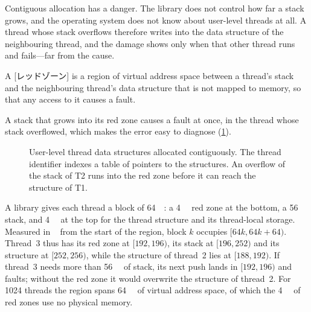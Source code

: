 \documentclass[../main.tex]{subfiles}
\begin{document}
Contiguous allocation has a danger.  The library does not control how far
a stack grows, and the operating system does not know about user-level
threads at all.  A thread whose stack overflows therefore writes into the
data structure of the neighbouring thread, and the damage shows only when
that other thread runs and fails---far from the cause.

\begin{definition}
  A [レッドゾーン] is a region of virtual address space
  between a thread's stack and the neighbouring thread's data structure
  that is not mapped to memory, so that any access to it causes a
  fault.
\end{definition}

A stack that grows into its red zone causes a fault at once, in the thread
whose stack overflowed, which makes the error easy to diagnose
(\cref{fig:l05-ult-layout}).

\begin{figure}[htbp]
  \centering
  
  \caption{User-level thread data structures allocated contiguously.  The
    thread identifier indexes a table of pointers to the structures.  An
    overflow of the stack of T2 runs into the red zone before it can reach
    the structure of T1.}
  \label{fig:l05-ult-layout}
\end{figure}

\begin{example}
  A library gives each thread a block of \SI{64}{\kibi\byte}: a
  \SI{4}{\kibi\byte} red zone at the bottom, a \SI{56}{\kibi\byte} stack,
  and \SI{4}{\kibi\byte} at the top for the thread structure and its
  thread-local storage.  Measured in \si{\kibi\byte} from the start of the
  region, block $k$ occupies $[64k, 64k+64)$.  Thread~3 thus has its red
  zone at $[192, 196)$, its stack at $[196, 252)$ and its structure at
  $[252, 256)$, while the structure of thread~2 lies at $[188, 192)$.  If
  thread~3 needs more than \SI{56}{\kibi\byte} of stack, its next push
  lands in $[192, 196)$ and faults; without the red zone it would overwrite
  the structure of thread~2.  For 1024 threads the region spans
  \SI{64}{\mebi\byte} of virtual address space, of which the
  \SI{4}{\mebi\byte} of red zones use no physical memory.
\end{example}
\end{document}
